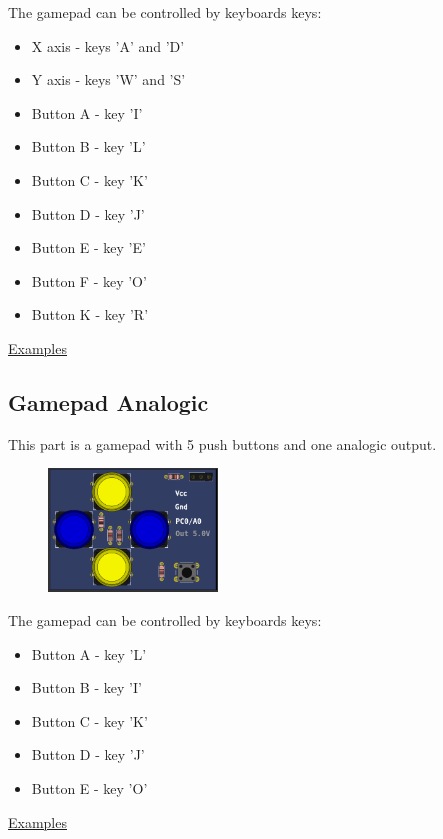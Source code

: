 The gamepad can be controlled by keyboards keys:
\begin{itemize}
 \item X axis - keys 'A' and 'D'
 \item Y axis - keys 'W' and 'S'
 \item Button A - key 'I'
 \item Button B - key 'L'
 \item Button C - key 'K'
 \item Button D - key 'J'
 \item Button E - key 'E'
 \item Button F - key 'O'
 \item Button K - key 'R'
\end{itemize}


\href{https://lcgamboa.github.io/picsimlab_examples/examples/examples_index.html\#Gamepad}{Examples}

\subsection{Gamepad Analogic}

This part is a gamepad with 5 push buttons and one analogic output.

\begin{figure}[H]
\center
\includegraphics[width=0.4\textwidth]{img/part_gamepad_an.png} 
\end{figure} 


The gamepad can be controlled by keyboards keys:
\begin{itemize}
 \item Button A - key 'L'
 \item Button B - key 'I'
 \item Button C - key 'K'
 \item Button D - key 'J'
 \item Button E - key 'O'
 \end{itemize}


\href{https://lcgamboa.github.io/picsimlab_examples/examples/examples_index.html\#Gamepad_Analogic}{Examples}

